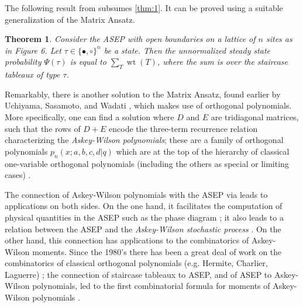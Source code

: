 \documentclass[11pt]{amsart}
\DeclareMathOperator{\wt}{wt}
\newtheorem{theorem}{Theorem}[section]
\theoremstyle{definition}
\theoremstyle{remark}
\begin{document}
The following result from \cite{CWPNAS, CW4}
subsumes \cref{thm:1}.  It can be proved using
a suitable generalization
of the Matrix Ansatz.  

\begin{theorem}\label{thm:2}
Consider the ASEP with open boundaries on a lattice of $n$ sites
as in Figure 6.
Let $\tau\in \{\bullet,\circ\}^n$ be
a state.  Then the 
unnormalized steady state probability $\Psi(\tau)$ is equal to 
 $\sum_T \wt(T)$, where the sum is over the 
staircase tableaux of type $\tau$.
\end{theorem}


Remarkably, there is another solution to the Matrix Ansatz,
found earlier by Uchiyama, Sasamoto, and Wadati \cite{USW}, which makes
use of orthogonal polynomials.  More specifically, one can find a 
solution where $D$ and $E$ are tridiagonal matrices, such that the  rows of
$D+E$ encode
the three-term recurrence relation characterizing the 
\emph{Askey-Wilson polynomials};
these %
are a family of orthogonal polynomials
$p_n(x; a, b, c, d|q)$ which are at the top of the hierarchy of 
classical one-variable orthogonal polynomials (including
the others as special or limiting cases)
\cite{AW}.  

The connection of Askey-Wilson polynomials with the ASEP via \cite{USW} 
leads to applications on both sides.  On the one hand, 
it facilitates the 
computation of physical quantities in the ASEP
such as the  {phase diagram} \cite{USW};
it also leads to a relation between the ASEP
and the \emph{Askey-Wilson stochastic process} \cite{Bryc}. 
On the other hand, this connection has applications to the 
combinatorics of Askey-Wilson 
moments.  Since the 1980's there has been a great deal of 
work on the combinatorics
 of classical orthogonal polynomials (e.g. Hermite, Charlier, Laguerre)
\cite{Viennot-book,  ISV,  CKS};
the connection of staircase tableaux to ASEP, and of ASEP to Askey-Wilson polynomials, led
to the first combinatorial formula for moments of Askey-Wilson polynomials \cite{CW4, CSSW}.
\end{document}
